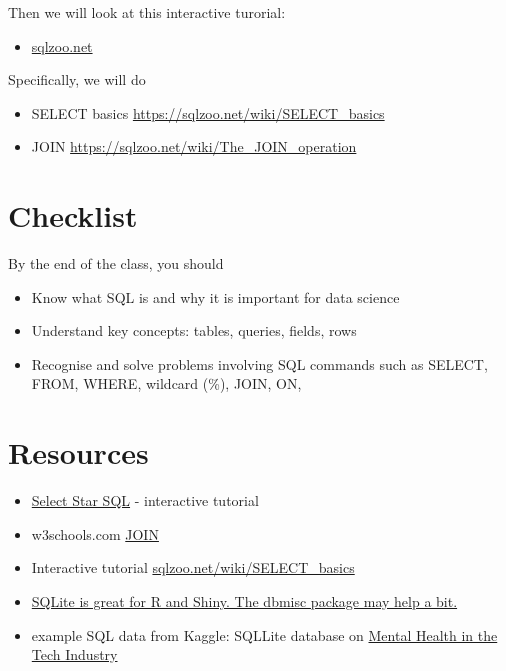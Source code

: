 \documentclass[
]{book}
\providecommand{\tightlist}{%
  \setlength{\itemsep}{0pt}\setlength{\parskip}{0pt}}
\begin{document}
Then we will look at this interactive turorial:

\begin{itemize}
\tightlist
\item
  \href{https://sqlzoo.net}{sqlzoo.net}
\end{itemize}

Specifically, we will do

\begin{itemize}
\tightlist
\item
  SELECT basics \url{https://sqlzoo.net/wiki/SELECT_basics}
\item
  JOIN \url{https://sqlzoo.net/wiki/The_JOIN_operation}
\end{itemize}

\hypertarget{checklist-9}{%
\section{Checklist}\label{checklist-9}}

By the end of the class, you should

\begin{itemize}
\tightlist
\item
  Know what SQL is and why it is important for data science
\item
  Understand key concepts: tables, queries, fields, rows
\item
  Recognise and solve problems involving SQL commands such as SELECT, FROM, WHERE, wildcard (\%), JOIN, ON,
\end{itemize}

\hypertarget{resources-11}{%
\section{Resources}\label{resources-11}}

\begin{itemize}
\tightlist
\item
  \href{https://selectstarsql.com/}{Select Star SQL} - interactive tutorial
\item
  w3schools.com \href{https://www.w3schools.com/sql/sql_join.asp}{JOIN}
\item
  Interactive tutorial \href{https://sqlzoo.net/wiki/SELECT_basics}{sqlzoo.net/wiki/SELECT\_basics}
\item
  \href{https://www.r-bloggers.com/2021/03/sqlite-is-great-for-r-and-shiny-the-dbmisc-package-may-help-a-bit/}{SQLite is great for R and Shiny. The dbmisc package may help a bit.}
\item
  example SQL data from Kaggle: SQLLite database on \href{https://www.kaggle.com/anth7310/mental-health-in-the-tech-industry}{Mental Health in the Tech Industry}
\end{itemize}
\end{document}
